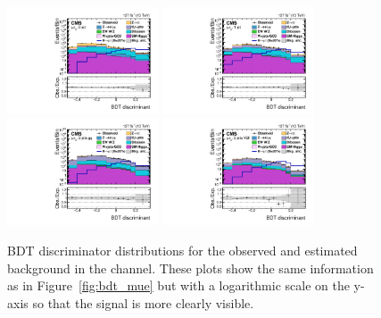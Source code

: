 \begin{figure}[htbp!]
  \centering
  \includegraphics[width=0.4\textwidth]{plots/chapter9/BDT/mue/log_0jet.pdf}
  \includegraphics[width=0.4\textwidth]{plots/chapter9/BDT/mue/log_1jet.pdf} \\
  \includegraphics[width=0.4\textwidth]{plots/chapter9/BDT/mue/log_2jet_gg.pdf}
  \includegraphics[width=0.4\textwidth]{plots/chapter9/BDT/mue/log_2jet_vbf.pdf} \\
  \caption{BDT discriminator distributions for the observed and estimated background in the \mue channel. These plots show the same information as in Figure~\ref{fig:bdt_mue} but with a logarithmic scale on the y-axis so that the signal is more clearly visible.}
  \label{fig:bdt_mue_log}
\end{figure}

